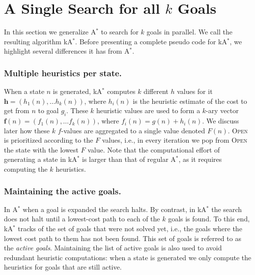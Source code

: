 \documentclass{aicom2e}
\newcommand{\astar}{A$^*$}
\newcommand{\kastar}{kA$^*$}
\newcommand{\open}{\textsc{Open}}
\begin{document}
\section{A Single Search for all  $k$ Goals}
\label{sec:one-k-goal-search}
In this section we generalize \astar{} to search for $k$ goals in parallel. 
We call the resulting algorithm \kastar{}. 
Before presenting a complete pseudo code for \kastar{}, we highlight several differences it has from \astar{}. 

\subsubsection*{Multiple heuristics per state.} When a state $n$ is generated, \kastar{} computes 
$k$ different $h$ values for it $\textbf{h}=(h_1(n),\ldots h_k(n))$, where $h_i(n)$ is the heuristic estimate of the cost to get from $n$ to goal $g_i$. These $k$ heuristic values are used to form a $k$-ary vector $\textbf{f}(n)=(f_1(n),\ldots f_k(n))$, where $f_i(n)=g(n)+h_i(n)$. We discuss later how these $k$ $f$-values are aggregated to a single value denoted $F(n)$. \open{} is prioritized according to the $F$ values, i.e., in every iteration we pop from \open{} the state with the lowest $F$ value. Note that the computational effort of generating a state in \kastar{} is larger than that of regular \astar{}, as it requires computing the $k$ heuristics. %

\subsubsection*{Maintaining the active goals.} In \astar{} when a goal is expanded the search halts. By contrast, in \kastar{} the search does not halt until a lowest-cost path to each of the $k$ goals is found. To this end, \kastar{} tracks of the set of goals that were not solved yet, i.e., the goals where the lowest cost path to them has not been found. This set of goals is referred to as the {\em active goals}. Maintaining the list of active goals is also used to avoid redundant heuristic computations: when a state is generated we only compute the heuristics for goals that are still active. 
\end{document}
